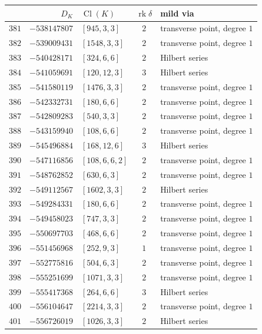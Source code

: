 \documentclass[11pt]{article}
\newcommand{\Cl}{\operatorname{Cl}}
\newcommand{\rk}{\operatorname{rk}}
\begin{document}
\begin{center}\small
\setlength{\tabcolsep}{5pt}%
\begin{longtable}{r r l c l}
\toprule
& $D_K$ & $\Cl(K)$ & $\rk\delta$ & mild via\\
\midrule
\endhead
\bottomrule
\endfoot

$381$ & $-538147807$ & $[945,3,3]$ & $2$ & transverse point, degree $1$\\
$382$ & $-539009431$ & $[1548,3,3]$ & $2$ & transverse point, degree $1$\\
$383$ & $-540428171$ & $[324,6,6]$ & $2$ & Hilbert series\\
$384$ & $-541059691$ & $[120,12,3]$ & $3$ & Hilbert series\\
$385$ & $-541580119$ & $[1476,3,3]$ & $2$ & transverse point, degree $1$\\
$386$ & $-542332731$ & $[180,6,6]$ & $2$ & transverse point, degree $1$\\
$387$ & $-542809283$ & $[540,3,3]$ & $2$ & transverse point, degree $1$\\
$388$ & $-543159940$ & $[108,6,6]$ & $2$ & transverse point, degree $1$\\
$389$ & $-545496884$ & $[168,12,6]$ & $3$ & Hilbert series\\
$390$ & $-547116856$ & $[108,6,6,2]$ & $2$ & transverse point, degree $1$\\
$391$ & $-548762852$ & $[630,6,3]$ & $2$ & transverse point, degree $1$\\
$392$ & $-549112567$ & $[1602,3,3]$ & $2$ & Hilbert series\\
$393$ & $-549284331$ & $[180,6,6]$ & $2$ & transverse point, degree $1$\\
$394$ & $-549458023$ & $[747,3,3]$ & $2$ & transverse point, degree $1$\\
$395$ & $-550697703$ & $[468,6,6]$ & $2$ & transverse point, degree $1$\\
$396$ & $-551456968$ & $[252,9,3]$ & $1$ & transverse point, degree $1$\\
$397$ & $-552775816$ & $[504,6,3]$ & $2$ & transverse point, degree $1$\\
$398$ & $-555251699$ & $[1071,3,3]$ & $2$ & transverse point, degree $1$\\
$399$ & $-555417368$ & $[264,6,6]$ & $3$ & Hilbert series\\
$400$ & $-556104647$ & $[2214,3,3]$ & $2$ & transverse point, degree $1$\\
$401$ & $-556726019$ & $[1026,3,3]$ & $2$ & Hilbert series\\

\end{longtable}
\end{center}
\end{document}

